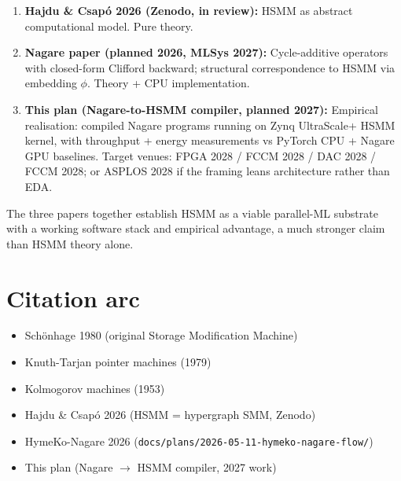 \documentclass[11pt]{article}
\begin{document}
\begin{enumerate}
  \item \textbf{Hajdu \& Csapó 2026 (Zenodo, in review):} HSMM as
    abstract computational model. Pure theory.
  \item \textbf{Nagare paper (planned 2026, MLSys 2027):} Cycle-additive
    operators with closed-form Clifford backward; structural
    correspondence to HSMM via embedding $\phi$. Theory + CPU
    implementation.
  \item \textbf{This plan (Nagare-to-HSMM compiler, planned 2027):}
    Empirical realisation: compiled Nagare programs running on
    Zynq UltraScale+ HSMM kernel, with throughput + energy
    measurements vs PyTorch CPU + Nagare GPU baselines. Target
    venues: FPGA 2028 / FCCM 2028 / DAC 2028 / FCCM 2028; or
    ASPLOS 2028 if the framing leans architecture rather than
    EDA.
\end{enumerate}

The three papers together establish HSMM as a viable parallel-ML
substrate with a working software stack and empirical advantage,
a much stronger claim than HSMM theory alone.

\section{Citation arc}

\begin{itemize}
  \item Schönhage 1980 (original Storage Modification Machine)
  \item Knuth-Tarjan pointer machines (1979)
  \item Kolmogorov machines (1953)
  \item Hajdu \& Csapó 2026 (HSMM = hypergraph SMM, Zenodo)
  \item HymeKo-Nagare 2026 (\texttt{docs/plans/2026-05-11-hymeko-nagare-flow/})
  \item This plan (Nagare $\to$ HSMM compiler, 2027 work)
\end{itemize}
\end{document}
